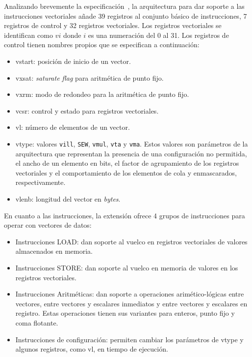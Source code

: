 Analizando brevemente la especificación~\cite{riscv-isa2024}, la arquitectura
para dar soporte a las instrucciones vectoriales añade 39 registros al conjunto
básico de instrucciones, 7 registros de control y 32 registros vectoriales. Los
registros vectoriales se identifican como $v{i}$ donde $i$ es una numeración
del 0 al 31. Los registros de control tienen nombres propios que se especifican
a continuación:

\begin{itemize}
    \item vstart: posición de inicio de un vector.
    \item vxsat: \textit{saturate flag} para aritmética de punto fijo.
    \item vxrm: modo de redondeo para la aritmética de punto fijo.
    \item vcsr: control y estado para registros vectoriales.
    \item vl: número de elementos de un vector.
    \item vtype: valores \texttt{vill}, \texttt{SEW}, \texttt{vmul},
    \texttt{vta} y  \texttt{vma}. Estos valores son parámetros de la
    arquitectura que representan la presencia de una configuración no
    permitida, el ancho de un elemento en bits, el factor de agrupamiento de
    los registros vectoriales y el comportamiento de los elementos de cola y
    enmascarados, respectivamente.
    \item vlenb: longitud del vector en \textit{bytes}.
\end{itemize}

En cuanto a las instrucciones, la extensión ofrece 4 grupos de instrucciones para operar con vectores de datos:
\begin{itemize}
    \item Instrucciones LOAD\@: dan soporte al vuelco en registros vectoriales de valores almacenados en memoria.
    \item Instrucciones STORE\@: dan soporte al vuelco en memoria de valores en los registros vectoriales.
    \item Instrucciones Aritméticas: dan soporte a operaciones
    arimético-lógicas entre vectores, entre vectores y escalares inmediatos y
    entre vectores y escalares en registro. Estas operaciones tienen sus
    variantes para enteros, punto fijo y coma flotante.
    \item Instrucciones de configuración: permiten cambiar los parámetros de
    vtype y algunos registros, como vl, en tiempo de ejecución.
\end{itemize}

